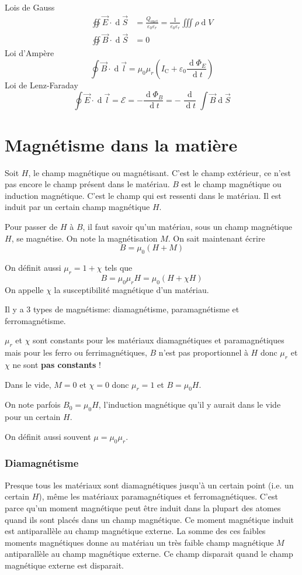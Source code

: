 \documentclass[11pt,a4paper]{article}
\newcommand{\B}{\vec B}
\newcommand{\E}{\vec E}
\newcommand{\EMF}{\mathcal{E}}
\DeclareMathOperator{\diff}{d}
\newcommand{\dif}{\diff\!}
\begin{document}
Lois de Gauss
\begin{align*}
	\oiint \E \cdot \dif \vec S &= \frac{Q_\mathrm{encl}}{\varepsilon_0\varepsilon_r} = \frac{1}{\varepsilon_0\varepsilon_r}\iiint \rho \dif V\\
	\oiint \B \cdot \dif \vec S &= 0
\end{align*}
Loi d'Ampère
\[ \oint \B \cdot \dif \vec l = \mu_0\mu_r \left(I_\mathrm{C} + \varepsilon_0 \frac{\dif \Phi_E}{\dif t}\right) \]%
Loi de Lenz-Faraday
\[ \oint \E \cdot \dif \vec l = \EMF = - \frac{\dif \Phi_B}{\dif t} = - \frac{\dif}{\dif t}\int \B \dif \vec S \]

\part{Magnétisme dans la matière}
Soit $H$, le champ magnétique ou magnétisant.
C'est le champ extérieur, ce n'est pas encore le champ présent dans le matériau.
$B$ est le champ magnétique ou induction magnétique.
C'est le champ qui est ressenti dans le matériau.
Il est induit par un certain champ magnétique $H$.

Pour passer de $H$ à $B$, il faut savoir qu'un matériau, sous un champ magnétique $H$, se magnétise.
On note la magnétisation $M$.
On sait maintenant écrire
\[ B = \mu_0 (H + M) \]

On définit aussi $\mu_r = 1 + \chi$ tels que
\[ B = \mu_0\mu_r H = \mu_0 (H + \chi H) \]
On appelle $\chi$ la susceptibilité magnétique d'un matériau.

Il y a 3 types de magnétisme: diamagnétisme, paramagnétisme et ferromagnétisme.

$\mu_r$ et $\chi$ sont constants pour les matériaux diamagnétiques et paramagnétiques mais pour les ferro ou ferrimagnétiques, $B$ n'est pas proportionnel à $H$ donc $\mu_r$ et $\chi$ ne sont \textbf{pas constants} !

Dans le vide, $M = 0$ et $\chi = 0$ donc $\mu_r = 1$ et $B = \mu_0 H$.

On note parfois $B_0 = \mu_0 H$, l'induction magnétique qu'il y aurait dans le vide pour un certain $H$.

On définit aussi souvent $\mu = \mu_0 \mu_r$.
\section{Diamagnétisme}
Presque tous les matériaux sont diamagnétiques jusqu'à un certain point (i.e. un certain $H$), même les matériaux paramagnétiques et ferromagnétiques.
C'est parce qu'un moment magnétique peut être induit dans la plupart des atomes quand ils sont placés dans un champ magnétique.
Ce moment magnétique induit est antiparallèle au champ magnétique externe.
La somme des ces faibles moments magnétiques donne au matériau un très faible champ magnétique $M$ antiparallèle au champ magnétique externe.
Ce champ disparait quand le champ magnétique externe est disparait.
\end{document}
